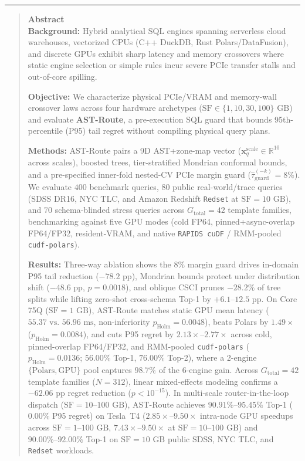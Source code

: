 \documentclass[10pt,a4paper]{article}
\begin{document}
\noindent\rule{\textwidth}{0.8pt}
\begin{quote}
\small\sffamily
\textbf{\color{springerblue}Abstract}\\[0.3em]
\textbf{Background:} Hybrid analytical SQL engines spanning serverless cloud warehouses, vectorized CPUs (C++ DuckDB, Rust Polars/DataFusion), and discrete GPUs exhibit sharp latency and memory crossovers where static engine selection or simple rules incur severe PCIe transfer stalls and out-of-core spilling.

\textbf{Objective:} We characterize physical PCIe/VRAM and memory-wall crossover laws across four hardware archetypes ($\text{SF}\in\{1,10,30,100\}\text{ GB}$) and evaluate \textbf{AST-Route}, a pre-execution SQL guard that bounds 95th-percentile (P95) tail regret without compiling physical query plans.

\textbf{Methods:} AST-Route pairs a 9D AST+zone-map vector ($\mathbf{x}_q^{\text{scale}}\in\mathbb{R}^{10}$ across scales), boosted trees, tier-stratified Mondrian conformal bounds, and a pre-specified inner-fold nested-CV PCIe margin guard ($\hat{\tau}_{\text{guard}}^{(-k)}=8\%$). We evaluate $400$ benchmark queries, $80$ public real-world/trace queries (SDSS DR16, NYC TLC, and Amazon Redshift \texttt{Redset} at $\text{SF}=10\text{ GB}$), and $70$ schema-blinded stress queries across $G_{\text{total}}=42$ template families, benchmarking against five GPU modes (cold FP64, pinned+async-overlap FP64/FP32, resident-VRAM, and native \texttt{RAPIDS cuDF} / RMM-pooled \texttt{cudf-polars}).

\textbf{Results:} Three-way ablation shows the $8\%$ margin guard drives in-domain P95 tail reduction ($-78.2\text{ pp}$), Mondrian bounds protect under distribution shift ($-48.6\text{ pp}$, $p=0.0018$), and oblique $\text{CSCI}$ prunes $-28.2\%$ of tree splits while lifting zero-shot cross-schema Top-1 by $+6.1\text{--}12.5\text{ pp}$. On Core 75Q ($\text{SF}=1\text{ GB}$), AST-Route matches static GPU mean latency ($55.37\text{ vs.\ }56.96\text{ ms}$, non-inferiority $p_{\text{Holm}}=0.0048$), beats Polars by $1.49\times$ ($p_{\text{Holm}}=0.0084$), and cuts P95 regret by $2.13\times\text{--}2.77\times$ across cold, pinned-overlap FP64/FP32, and RMM-pooled \texttt{cudf-polars} ($p_{\text{Holm}}=0.0136$; $56.00\%$ Top-1, $76.00\%$ Top-2), where a 2-engine $\{\text{Polars},\text{GPU}\}$ pool captures $98.7\%$ of the 6-engine gain. Across $G_{\text{total}}=42$ template families ($N=312$), linear mixed-effects modeling confirms a $-62.06\text{ pp}$ regret reduction ($p<10^{-15}$). In multi-scale router-in-the-loop dispatch ($\text{SF}=10\text{--}100\text{ GB}$), AST-Route achieves $90.91\%\text{--}95.45\%$ Top-1 ($0.00\%$ P95 regret) on Tesla~T4 ($2.85\times\text{--}9.50\times$ intra-node GPU speedups across $\text{SF}=1\text{--}100\text{ GB}$, $7.43\times\text{--}9.50\times$ at $\text{SF}=10\text{--}100\text{ GB}$) and $90.00\%\text{--}92.00\%$ Top-1 on $\text{SF}=10\text{ GB}$ public SDSS, NYC TLC, and \texttt{Redset} workloads.


\end{quote}
\end{document}
